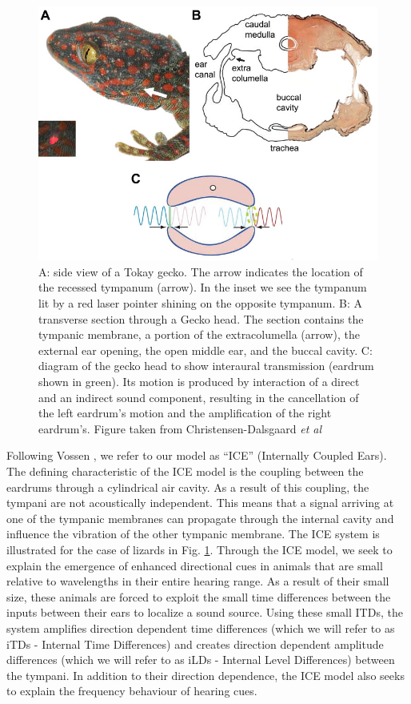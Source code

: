 \documentclass[12pt]{book}
\begin{document}
\begin{figure}[ht]
 \centering
 \includegraphics[width=0.6\linewidth]{Diagrams/geckoICE.jpg}
 \caption[Illustration of ICE for a lizard]{A: side view of a Tokay gecko. The arrow indicates the location of the recessed tympanum (arrow).
 In the inset we see the tympanum lit by a red laser pointer shining on the opposite tympanum. B: A transverse section through a 
 Gecko head. The section contains the tympanic membrane, a portion of the extracolumella (arrow), the external ear opening, the open middle ear, 
 and the buccal cavity. C: diagram of the gecko 
 head to show interaural transmission (eardrum shown in green). Its motion is produced by interaction of a direct and an indirect sound component, resulting in the
 cancellation of the left eardrum's motion and the amplification of the right eardrum's. Figure taken from Christensen-Dalsgaard \emph{et al} \cite{dalsgaardtangcarr}
 }
 \label{geckoICE}
\end{figure}

Following Vossen \cite{vossenjasa},  we refer to our model as ``ICE'' (Internally Coupled Ears). The defining characteristic of the ICE model
is the coupling between the eardrums through a cylindrical air cavity. As a result of this coupling, the tympani are not acoustically independent.
This means that a signal arriving at one of the tympanic membranes can propagate through
the internal cavity and influence the vibration of the other tympanic membrane. The ICE system is illustrated for the case of lizards in Fig. \ref{geckoICE}.
Through the ICE model, we seek to explain the emergence of enhanced directional cues in animals that are small relative to wavelengths
in their entire hearing range. As a result of their small size, these animals are forced to exploit the small time differences between the inputs between
their ears to localize a sound source. Using these small ITDs, the system amplifies direction dependent
 time differences (which we will refer to as iTDs - Internal Time Differences) and  creates direction dependent amplitude differences (which we will
 refer to as iLDs - Internal Level Differences) between the tympani.
In addition to their direction dependence, the ICE model also seeks to explain the frequency behaviour of hearing cues. 
 
\end{document}
